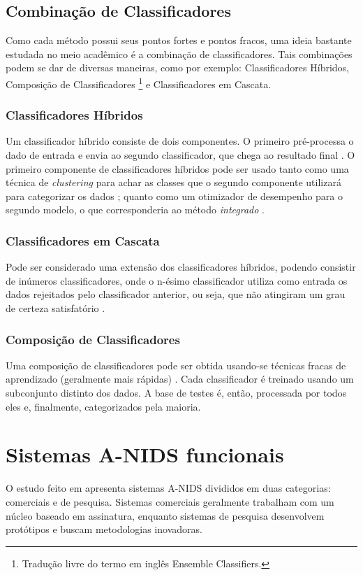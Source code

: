 \section{Combinação de Classificadores}
Como cada método possui seus pontos fortes e pontos fracos, uma ideia bastante estudada no meio acadêmico é a
 combinação de classificadores. Tais combinações podem se dar de diversas maneiras, como por exemplo: Classificadores
 Híbridos, Composição de Classificadores \footnote{Tradução livre do termo em inglês Ensemble Classifiers.} e
 Classificadores em Cascata.

 \subsection{Classificadores Híbridos}
    Um classificador híbrido consiste de dois componentes. O primeiro pré-processa o dado de entrada e envia ao segundo
    classificador, que chega ao resultado final \cite{tsai09}. O primeiro componente de classificadores híbridos pode ser usado tanto
    como uma técnica de \emph{clustering} para achar as classes que o segundo componente utilizará para categorizar os dados \cite{ni07};
    quanto como um otimizador de desempenho para o segundo modelo, o que corresponderia ao método \textit{integrado}
    \cite{aydin09}.


 \subsection{Classificadores em Cascata}
    \label{sec:cascade}
    Pode ser considerado uma extensão dos classificadores híbridos, podendo consistir de inúmeros classificadores, onde
    o n-ésimo classificador utiliza como entrada os dados rejeitados pelo classificador anterior, ou seja, que não
    atingiram um grau de certeza satisfatório \cite{tsai09}.

 \subsection{Composição de Classificadores}
    Uma composição de classificadores pode ser obtida usando-se técnicas fracas de aprendizado
    (geralmente mais rápidas) \cite{tsai09}. Cada classificador é treinado usando um subconjunto distinto dos dados.
    A base de testes é, então, processada por todos eles e, finalmente, categorizados pela maioria.


\chapter{Sistemas A-NIDS funcionais}
    O estudo feito em \cite{teodoro09} apresenta sistemas A-NIDS divididos em duas categorias: comerciais e de pesquisa.
    Sistemas comerciais geralmente trabalham com um núcleo baseado em assinatura, enquanto sistemas de pesquisa
    desenvolvem protótipos e buscam metodologias inovadoras.

